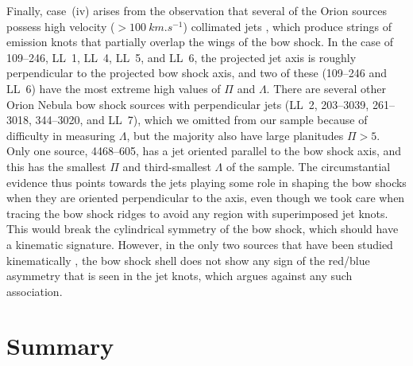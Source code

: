 \documentclass[useAMS, usenatbib, a4paper]{mnras}
\begin{document}
Finally, case~(iv) arises from the observation that several of the
Orion sources possess high velocity (\(> \SI{100}{km.s^{-1}}\))
collimated jets \citep{Bally:2006a}, which produce strings of emission
knots that partially overlap the wings of the bow shock.  In the case
of 109--246, LL~1, LL~4, LL~5, and LL~6, the projected jet axis is
roughly perpendicular to the projected bow shock axis, and two of
these (109--246 and LL~6) have the most extreme high values of \(\Pi\)
and \(\Lambda\).  There are several other Orion Nebula bow shock sources
with perpendicular jets (LL~2, 203--3039, 261--3018, 344--3020, and
LL~7), which we omitted from our sample because of difficulty in
measuring \(\Lambda\), but the majority also have large planitudes
\(\Pi > 5\). Only one source, 4468--605, has a jet oriented parallel to
the bow shock axis, and this has the smallest \(\Pi\) and third-smallest
\(\Lambda\) of the sample.  The circumstantial evidence thus points towards
the jets playing some role in shaping the bow shocks when they are
oriented perpendicular to the axis, even though we took care when
tracing the bow shock ridges to avoid any region with superimposed jet
knots.  This would break the cylindrical symmetry of the bow shock,
which should have a kinematic signature.  However, in the only two
sources that have been studied kinematically \citep{Henney:2013a}, the
bow shock shell does not show any sign of the red/blue asymmetry that
is seen in the jet knots, which argues against any such association.


\section{Summary}
\label{sec:conclusion}
\end{document}
